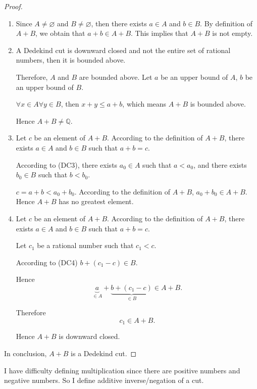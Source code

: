 \begin{proof}
    \begin{enumerate}[label = (\roman*)]
        \item Since $A\ne\varnothing$ and $B\ne\varnothing$, then there exists $a\in A$ and $b\in B$. By definition of $A + B$, we obtain that $a + b \in A + B$. This implies that $A + B$ is not empty.
        \item A Dedekind cut is downward closed and not the entire set of rational numbers, then it is bounded above.
              \par Therefore, $A$ and $B$ are bounded above. Let $a$ be an upper bound of $A$, $b$ be an upper bound of $B$.
              \par $\forall x\in A\forall y\in B$, then $x + y \le a + b$, which means $A + B$ is bounded above.
              \par Hence $A + B\ne\mathbb{Q}$.
        \item Let $c$ be an element of $A + B$. According to the definition of $A + B$, there exists $a\in A$ and $b\in B$ such that $a + b = c$.
              \par According to (DC3), there exists $a_{0}\in A$ such that $a < a_{0}$, and there exists $b_{0}\in B$ such that $b < b_{0}$.
              \par $c = a + b < a_{0} + b_{0}$. According to the definition of $A + B$, $a_{0} + b_{0} \in A + B$. Hence $A + B$ has no greatest element.
        \item Let $c$ be an element of $A + B$. According to the definition of $A + B$, there exists $a\in A$ and $b\in B$ such that $a + b = c$.
              \par Let $c_{1}$ be a rational number such that $c_{1} < c$.
              \par According to (DC4) $b + (c_{1} - c)\in B$.
              \par Hence
              \[
                  \underbrace{a}_{\in A} + \underbrace{b + (c_{1} - c)}_{\in B} \in A + B.
              \]
              \par Therefore
              \[
                  c_{1} \in A + B.
              \]
              \par Hence $A + B$ is downward closed.
    \end{enumerate}
    \par In conclusion, $A + B$ is a Dedekind cut.
\end{proof}

\par I have difficulty defining multiplication since there are positive numbers and negative numbers. So I define additive inverse/negation of a cut.

